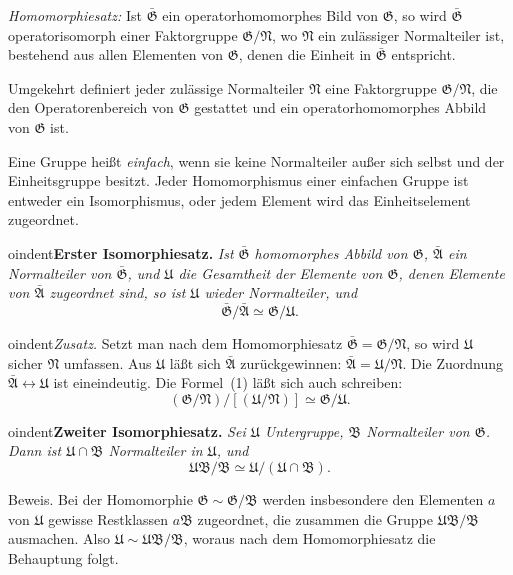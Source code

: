 \documentclass[12pt,a4paper]{article}
\theoremstyle{definition}
\begin{document}
\textit{Homomorphiesatz:} Ist $\bar{\mathfrak{G}}$ ein
operatorhomomorphes Bild von $\mathfrak{G}$, so wird
$\bar{\mathfrak{G}}$ operatorisomorph einer Faktorgruppe
$\mathfrak{G}/\mathfrak{N}$, wo $\mathfrak{N}$ ein zul\"assiger
Normalteiler ist, bestehend aus allen Elementen von $\mathfrak{G}$, denen
die Einheit in $\bar{\mathfrak{G}}$ entspricht.

Umgekehrt definiert jeder zul\"assige Normalteiler $\mathfrak{N}$ eine
Faktorgruppe $\mathfrak{G}/\mathfrak{N}$, die den Operatorenbereich von
$\mathfrak{G}$ gestattet und ein operatorhomomorphes Abbild von
$\mathfrak{G}$ ist.

\medskip

Eine Gruppe hei\ss t \textit{einfach}, wenn sie keine Normalteiler au\ss er
sich selbst und der Einheitsgruppe besitzt. Jeder Homomorphismus einer
einfachen Gruppe ist entweder ein Isomorphismus, oder jedem Element wird
das Einheitselement zugeordnet.

\medskip



oindent\textbf{Erster Isomorphiesatz.} \textit{Ist $\bar{\mathfrak{G}}$
homomorphes Abbild von $\mathfrak{G}$, $\bar{\mathfrak{A}}$ ein
Normalteiler von $\bar{\mathfrak{G}}$, und $\mathfrak{U}$ die Gesamtheit
der Elemente von $\mathfrak{G}$, denen Elemente von
$\bar{\mathfrak{A}}$ zugeordnet sind, so ist $\mathfrak{U}$ wieder
Normalteiler, und}
\[
\bar{\mathfrak{G}}/\bar{\mathfrak{A}} \simeq \mathfrak{G}/\mathfrak{U}.
\]



oindent\textit{Zusatz.} Setzt man nach dem Homomorphiesatz
$\bar{\mathfrak{G}} = \mathfrak{G}/\mathfrak{N}$, so wird
$\mathfrak{U}$ sicher $\mathfrak{N}$ umfassen. Aus $\mathfrak{U}$
l\"a\ss t sich $\bar{\mathfrak{A}}$ zur\"uckgewinnen:
$\bar{\mathfrak{A}} = \mathfrak{U}/\mathfrak{N}$. Die Zuordnung
$\bar{\mathfrak{A}} \leftrightarrow \mathfrak{U}$ ist eineindeutig. Die
Formel~(1) l\"a\ss t sich auch schreiben:
\[
(\mathfrak{G}/\mathfrak{N}) / [(\mathfrak{U}/\mathfrak{N})] \simeq
\mathfrak{G}/\mathfrak{U}.
\]

\medskip



oindent\textbf{Zweiter Isomorphiesatz.} \textit{Sei $\mathfrak{U}$
Untergruppe, $\mathfrak{B}$ Normalteiler von $\mathfrak{G}$. Dann ist
$\mathfrak{U} \cap \mathfrak{B}$ Normalteiler in $\mathfrak{U}$, und}
\[
\mathfrak{U}\mathfrak{B}/\mathfrak{B} \simeq
\mathfrak{U}/(\mathfrak{U} \cap \mathfrak{B}).
\]

Beweis. Bei der Homomorphie $\mathfrak{G} \sim \mathfrak{G}/\mathfrak{B}$
werden insbesondere den Elementen $a$ von $\mathfrak{U}$ gewisse
Restklassen $a\mathfrak{B}$ zugeordnet, die zusammen die Gruppe
$\mathfrak{U}\mathfrak{B}/\mathfrak{B}$ ausmachen. Also
$\mathfrak{U} \sim \mathfrak{U}\mathfrak{B}/\mathfrak{B}$, woraus nach
dem Homomorphiesatz die Behauptung folgt.
\end{document}
